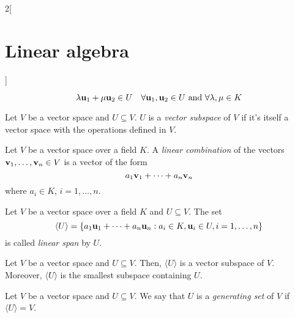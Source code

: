 \documentclass[../../../main_math.tex]{subfiles}
\begin{document}
\begin{multicols}{2}[\section{Linear algebra}]
\begin{definition}
    $$\lambda \boldsymbol{\mathrm{u}}_1+\mu \boldsymbol{\mathrm{u}}_2\in U\quad\forall \boldsymbol{\mathrm{u}}_1,\boldsymbol{\mathrm{u}}_2\in U\text{ and }\forall\lambda,\mu\in K$$
  \end{definition}
  \begin{definition}
    Let $V$ be a vector space and $U\subseteq V$. $U$ is a \emph{vector subspace} of $V$ if it's itself a vector space with the operations defined in $V$.
  \end{definition}
  \begin{definition}
    Let $V$ be a vector space over a field $K$. A \emph{linear combination} of the vectors $\boldsymbol{\mathrm{v}}_1,\ldots,\boldsymbol{\mathrm{v}}_n\in V$ is a vector of the form $$a_1\boldsymbol{\mathrm{v}}_1+\cdots+a_n\boldsymbol{\mathrm{v}}_n$$ where $a_i\in K$, $i=1,\ldots,n$.
  \end{definition}
  \begin{definition}
    Let $V$ be a vector space over a field $K$ and $U\subseteq V$. The set $$\langle U\rangle=\{a_1\boldsymbol{\mathrm{u}}_1+\cdots+a_n\boldsymbol{\mathrm{u}}_n:a_i\in K,\boldsymbol{\mathrm{u}}_i\in U,i=1,\ldots,n\}$$ is called \emph{linear span} by $U$.
  \end{definition}
  \begin{lemma}
    Let $V$ be a vector space and $U\subseteq V$. Then, $\langle U\rangle$ is a vector subspace of $V$. Moreover, $\langle U\rangle$ is the smallest subspace containing $U$.
  \end{lemma}
  \begin{definition}
    Let $V$ be a vector space and $U\subseteq V$. We say that $U$ is a \emph{generating set} of $V$ if $\langle U\rangle=V$.
  \end{definition}

\end{multicols}
\end{document}

